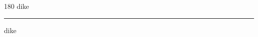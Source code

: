 
\begin{frame}
\begin{center}
\begin{turn}{180}
{\fontsize{2.5cm}{1em}\selectfont dike}
\end{turn}
\vspace{1em}\par  
\hrule
\vspace{1em}\par  
{\fontsize{2.5cm}{1em}\selectfont dike}
\end{center}
\end{frame}
